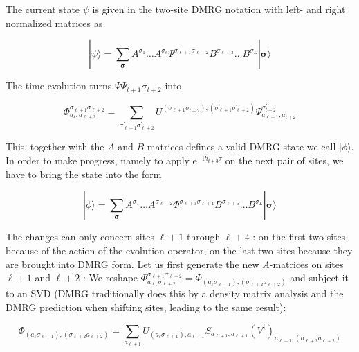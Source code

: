 \documentclass[12pt]{article}
\begin{document}
The current state $\psi$ is given in the two-site DMRG notation with left- and right normalized matrices as


\begin{equation*}
|\psi\rangle=\sum_{\boldsymbol{\sigma}} A^{\sigma_{1}} \ldots A^{\sigma_{\ell}} \Psi^{\sigma_{\ell+1} \sigma_{\ell+2}} B^{\sigma_{\ell+3}} \ldots B^{\sigma_{L}}|\boldsymbol{\sigma}\rangle \tag{255}
\end{equation*}


The time-evolution turns $\Psi \Psi_{t+1} \sigma_{t+2}$ into


\begin{equation*}
\Phi_{a_{\ell}, a_{\ell+2}}^{\sigma_{\ell+1} \sigma_{\ell+2}}=\sum_{\sigma_{\ell+1}^{\prime} \sigma_{\ell+2}^{\prime}} U^{\left(\sigma_{\ell+1} \sigma_{t+2}\right),\left(\sigma_{\ell+1}^{\prime} \sigma_{\ell+2}^{\prime}\right)} \Psi_{a_{\ell+1}, a_{t+2}}^{\sigma_{t+2}^{\prime}} \tag{256}
\end{equation*}


This, together with the $A$ and $B$-matrices defines a valid DMRG state we call $|\phi\rangle$. In order to make progress, namely to apply $\mathrm{e}^{-\mathrm{i} \hat{h}_{t+3} \tau}$ on the next pair of sites, we have to bring the state into the form


\begin{equation*}
|\phi\rangle=\sum_{\boldsymbol{\sigma}} A^{\sigma_{1}} \ldots A^{\sigma_{\ell+2}} \Phi^{\sigma_{\ell+3} \sigma_{\ell+4}} B^{\sigma_{\ell+5}} \ldots B^{\sigma_{L}}|\boldsymbol{\sigma}\rangle \tag{257}
\end{equation*}


The changes can only concern sites $\ell+1$ through $\ell+4$ : on the first two sites because of the action of the evolution operator, on the last two sites because they are brought into DMRG form. Let us first generate the new $A$-matrices on sites $\ell+1$ and $\ell+2$ : We reshape $\Phi_{a_{\ell,} \sigma_{\ell+2}}^{\sigma_{\ell+1} \sigma_{\ell+2}}=\Phi_{\left(a_{\ell} \sigma_{\ell+1}\right),\left(\sigma_{\ell+2} a_{\ell+2}\right)}$ and subject it to an SVD (DMRG traditionally does this by a density matrix analysis and the DMRG prediction when shifting sites, leading to the same result):


\begin{equation*}
\Phi_{\left(a_{\ell} \sigma_{\ell+1}\right),\left(\sigma_{\ell+2} a_{\ell+2}\right)}=\sum_{a_{\ell+1}} U_{\left(a_{\ell} \sigma_{\ell+1}\right), a_{\ell+1}} S_{a_{\ell+1}, a_{\ell+1}}\left(V^{\dagger}\right)_{a_{\ell+1},\left(\sigma_{\ell+2} a_{\ell+2}\right)} \tag{258}
\end{equation*}
\end{document}
